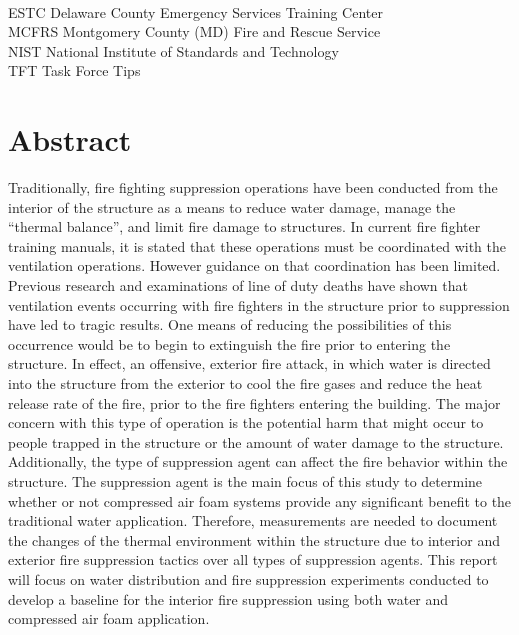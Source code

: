 \documentclass[12pt,oneside]{book}
\begin{document}
\begin{tabbing}
\hspace{1.5in} \= \\
ESTC \> Delaware County Emergency Services Training Center \\
MCFRS \> Montgomery County (MD) Fire and Rescue Service \\
NIST \> National Institute of Standards and Technology \\
TFT \> Task Force Tips \\
\end{tabbing}

\mainmatter

\chapter*{\centering Abstract}
Traditionally, fire fighting suppression operations have been conducted from the interior of the structure as a means to reduce water damage, manage the ``thermal balance'', and limit fire damage to structures. In current fire fighter training manuals, it is stated that these operations must be coordinated with the ventilation operations. However guidance on that coordination has been limited. Previous research and examinations of line of duty deaths have shown that ventilation events occurring with fire fighters in the structure prior to suppression have led to tragic results. One means of reducing the possibilities of this occurrence would be to begin to extinguish the fire prior to entering the structure. In effect, an offensive, exterior fire attack, in which water is directed into the structure from the exterior to cool the fire gases and reduce the heat release rate of the fire, prior to the fire fighters entering the building. The major concern with this type of operation is the potential harm that might occur to people trapped in the structure or the amount of water damage to the structure. Additionally, the type of suppression agent can affect the fire behavior within the structure. The suppression agent is the main focus of this study to determine whether or not compressed air foam systems provide any significant benefit to the traditional water application. Therefore, measurements are needed to document the changes of the thermal environment within the structure due to interior and exterior fire suppression tactics over all types of suppression agents. This report will focus on water distribution and fire suppression experiments conducted to develop a baseline for the interior fire suppression using both water and compressed air foam application.
\end{document}
